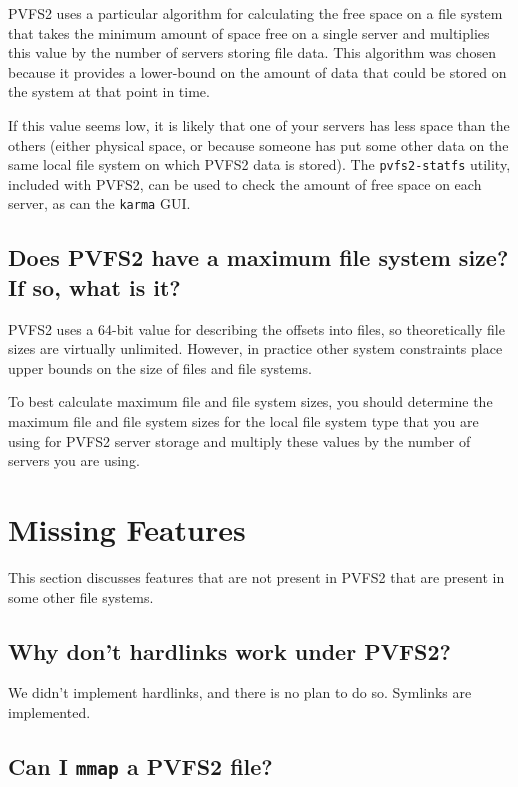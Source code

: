 \documentclass[11pt,letterpaper]{article}
\begin{document}
PVFS2 uses a particular algorithm for calculating the free space on a file
system that takes the minimum amount of space free on a single server and
multiplies this value by the number of servers storing file data.
%
This algorithm was chosen because it provides a lower-bound on the amount of
data that could be stored on the system at that point in time.

If this value seems low, it is likely that one of your servers has less space
than the others (either physical space, or because someone has put some other
data on the same local file system on which PVFS2 data is stored).  The
\texttt{pvfs2-statfs} utility, included with PVFS2, can be used to check the
amount of free space on each server, as can the \texttt{karma} GUI.

\subsection{Does PVFS2 have a maximum file system size? If so, what is it?}

PVFS2 uses a 64-bit value for describing the offsets into files, so
theoretically file sizes are virtually unlimited.  However, in practice other
system constraints place upper bounds on the size of files and file systems.

To best calculate maximum file and file system sizes, you should determine the
maximum file and file system sizes for the local file system type that you are
using for PVFS2 server storage and multiply these values by the number of
servers you are using.

%
%
\section{Missing Features}

This section discusses features that are not present in PVFS2 that are present
in some other file systems.

\subsection{Why don't hardlinks work under PVFS2?}

We didn't implement hardlinks, and there is no plan to do so.  Symlinks are
implemented.

\subsection{Can I \texttt{mmap} a PVFS2 file?}
\end{document}

